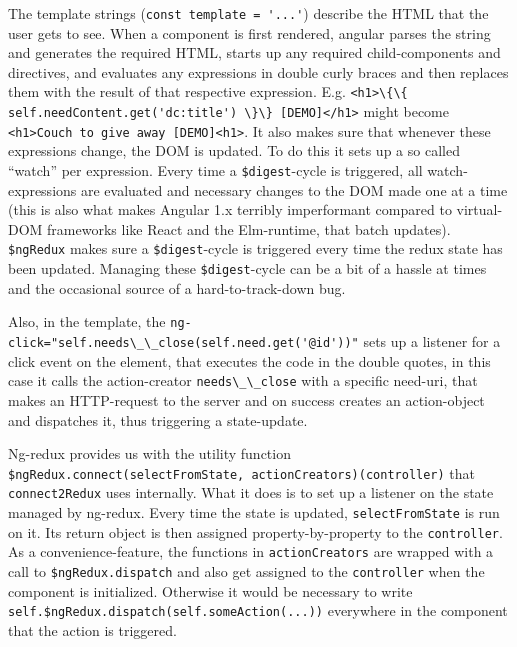 \documentclass[a4paper,,tablecaptionabove]{scrbook}
\newcommand{\passthrough}[1]{#1}
\begin{document}
The template strings (\passthrough{\lstinline!const template = '...'!})
describe the HTML that the user gets to see. When a component is first
rendered, angular parses the string and generates the required HTML,
starts up any required child-components and directives, and evaluates
any expressions in double curly braces and then replaces them with the
result of that respective expression. E.g.
\passthrough{\lstinline!<h1>\{\{ self.needContent.get('dc:title') \}\} [DEMO]</h1>!}
might become
\passthrough{\lstinline!<h1>Couch to give away [DEMO]<h1>!}. It also
makes sure that whenever these expressions change, the DOM is updated.
To do this it sets up a so called \enquote{watch} per expression. Every
time a \passthrough{\lstinline!$digest!}-cycle is triggered, all
watch-expressions are evaluated and necessary changes to the DOM made
one at a time (this is also what makes Angular 1.x terribly imperformant
compared to virtual-DOM frameworks like React and the Elm-runtime, that
batch updates). \passthrough{\lstinline!$ngRedux!} makes sure a
\passthrough{\lstinline!$digest!}-cycle is triggered every time the
redux state has been updated. Managing these
\passthrough{\lstinline!$digest!}-cycle can be a bit of a hassle at
times and the occasional source of a hard-to-track-down bug.

Also, in the template, the
\passthrough{\lstinline!ng-click="self.needs\_\_close(self.need.get('@id'))"!}
sets up a listener for a click event on the element, that executes the
code in the double quotes, in this case it calls the action-creator
\passthrough{\lstinline!needs\_\_close!} with a specific need-uri, that
makes an HTTP-request to the server and on success creates an
action-object and dispatches it, thus triggering a state-update.

Ng-redux provides us with the utility function
\passthrough{\lstinline!$ngRedux.connect(selectFromState, actionCreators)(controller)!}
that \passthrough{\lstinline!connect2Redux!} uses internally. What it
does is to set up a listener on the state managed by ng-redux. Every
time the state is updated, \passthrough{\lstinline!selectFromState!} is
run on it. Its return object is then assigned property-by-property to
the \passthrough{\lstinline!controller!}. As a convenience-feature, the
functions in \passthrough{\lstinline!actionCreators!} are wrapped with a
call to \passthrough{\lstinline!$ngRedux.dispatch!} and also get
assigned to the \passthrough{\lstinline!controller!} when the component
is initialized. Otherwise it would be necessary to write
\passthrough{\lstinline!self.$ngRedux.dispatch(self.someAction(...))!}
everywhere in the component that the action is triggered.
\end{document}
